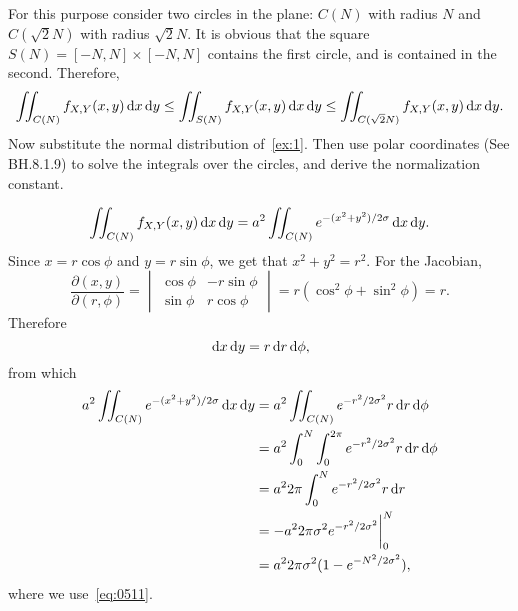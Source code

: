 \documentclass[lectures]{subfiles}
\begin{document}
\begin{exercise}
For this purpose consider two circles in the plane: $C(N)$ with radius $N$ and $C(\sqrt 2 N)$ with radius $\sqrt 2 N$.
It is obvious that the square $S(N) = [-N,N]\times[-N,N]$ contains the first circle, and is contained in the second.
Therefore,
\begin{equation}
  \label{eq:0513}
  \iint_{C(N)}f_{X,Y}(x,y) \,\textrm{d}x\,\textrm{d}y \leq
  \iint_{S(N)}f_{X,Y}(x,y) \,\textrm{d}x\,\textrm{d}y \leq
  \iint_{C(\sqrt 2 N)}f_{X,Y}(x,y) \,\textrm{d}x\,\textrm{d}y.
\end{equation}
Now substitute the normal distribution of~\cref{ex:1}.
Then use polar coordinates (See BH.8.1.9) to solve the integrals over the circles, and derive the normalization constant.
\begin{solution}
\begin{equation}
\label{eq:0514}
  \iint_{C(N)}f_{X,Y}(x,y) \,\textrm{d}x\,\textrm{d}y =
a^{2}  \iint_{C(N)} e^{-(x^{2}+y^{2})/2\sigma} \,\textrm{d}x\,\textrm{d}y.
\end{equation}
Since  $x = r \cos \phi$ and $y=r\sin \phi$, we get that $x^2+y^2 = r^{2}$. For the Jacobian,
\begin{equation}
  \label{eq:0515}
  \frac{\partial(x, y)}{\partial(r,\phi)} =
  \begin{vmatrix}
    \cos \phi  & -r\sin \phi \\
    \sin \phi  & r\cos \phi
  \end{vmatrix}
= r(\cos^{2} \phi + \sin^2 \phi) = r.
\end{equation}
Therefore
\begin{equation}
\label{eq:0516}
\,\textrm{d}x \,\textrm{d}y = r \,\textrm{d}r \,\textrm{d}\phi,
\end{equation}
from which
\begin{align}
a^{2}  \iint_{C(N)} e^{-(x^{2}+y^{2})/2\sigma} \,\textrm{d}x\,\textrm{d}y
&=a^{2}  \iint_{C(N)} e^{-r^{2}/2\sigma^{2}} r \,\textrm{d}r\,\textrm{d}\phi \\
&= a^{2}  \int_{0}^{N} \int_{0}^{2\pi} e^{-r^{2}/2\sigma^{2}} r \,\textrm{d}r\,\textrm{d}\phi \\
&= a^{2}  2\pi \int_{0}^{N}  e^{-r^{2}/2\sigma^{2}} r \,\textrm{d}r \\
&= - a^{2}  2\pi{\sigma^{2}} e^{-r^{2}/2\sigma^{2}}\biggr|_{0}^{N} \\
&= a^{2}2\pi{\sigma^{2}} (1-e^{-N^{2}/2\sigma^{2}}),
\end{align}
where we use~\cref{eq:0511}.



\end{solution}
\end{exercise}
\end{document}
